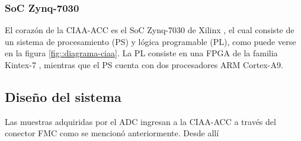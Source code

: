 \documentclass[../../main.tex]{subfiles}
\begin{document}
\subsubsection{SoC Zynq-7030}
El corazón  de la CIAA-ACC es el SoC Zynq-7030 de Xilinx \cite{SoC}, el cual consiste de un sistema de procesamiento (PS) y lógica programable (PL), como puede verse en la figura \ref{fig::diagrama-ciaa}. La PL consiste en una FPGA de la familia Kintex-7 \cite{Kintex-7}, mientras que el PS cuenta con dos procesadores ARM Cortex-A9.



\subsection{Diseño del sistema}
Las muestras adquiridas por el ADC ingresan a la CIAA-ACC a través del conector FMC como se mencionó anteriormente. Desde allí
\end{document}
